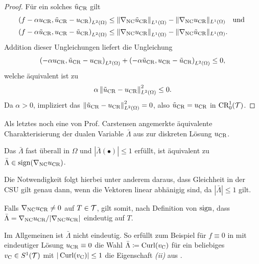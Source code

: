 \begin{proof}
  \medskip
  Für ein solches $\tilde{u}_{\textup{CR}}$ gilt
  \begin{align*}
    \left(f-\alpha u_\textup{CR},\tilde{u}_{\textup{CR}}-u_\textup{CR}\right)_{L^2(\Omega)} 
    &\leq
    \left\Vert\nabla_\textup{NC}\tilde{u}_{\textup{CR}}\right\Vert_{L^1(\Omega)}
    -\Vert\nabla_\textup{NC}u_\textup{CR}\Vert_{L^1(\Omega)}\quad\text{und }\\
    \left(f-\alpha\tilde{u}_{\textup{CR}},u_\textup{CR}-\tilde{u}_{\textup{CR}}\right)_{L^2(\Omega)} 
    &\leq
    \left\Vert\nabla_\textup{NC}u_\textup{CR}\right\Vert_{L^1(\Omega)}
    -\Vert\nabla_\textup{NC}\tilde{u}_{\textup{CR}}\Vert_{L^1(\Omega)}. 
  \end{align*}
  Addition dieser Ungleichungen
  liefert die Ungleichung
  \begin{align*}
    \left(-\alpha u_\textup{CR},\tilde{u}_{\textup{CR}}-u_\textup{CR}\right)_{L^2(\Omega)} 
    + \left(-\alpha\tilde{u}_{\textup{CR}},u_\textup{CR}-\tilde{u}_{\textup{CR}}\right)_{L^2(\Omega)} 
    \leq
    0,
  \end{align*}
  welche äquivalent ist zu
  \begin{align*}
    \alpha\left\Vert\tilde{u}_{\textup{CR}}-u_\textup{CR}\right\Vert_{L^2(\Omega)}^2
    \leq
    0.
  \end{align*}
  Da $\alpha>0$, impliziert das
  $\left\Vert\tilde{u}_{\textup{CR}}-u_\textup{CR}\right\Vert_{L^2(\Omega)}^2=0$, also
  $\tilde{u}_{\textup{CR}}=u_\textup{CR}$ in $\textup{CR}^1_0(\mathcal{T})$.
\end{proof}

Als letztes noch eine von Prof. Carstensen angemerkte äquivalente 
Charakterisierung der dualen Variable $\bar\Lambda$ aus
   zur diskreten Lösung
  $u_\textup{CR}$.
\begin{remark}
  Das $\bar\Lambda$ fast überall in $\Omega$
   und
  $|\bar\Lambda(\bullet)|\leq 1$ erfüllt, ist äquivalent zu 
  $\bar\Lambda\in\operatorname{sign}(\nabla_\textup{NC} u_\textup{CR})$.   

  Die Notwendigkeit folgt hierbei unter anderem daraus, dass Gleichheit in der
  CSU gilt genau dann, wenn die Vektoren linear abhänigig sind, da
  $|\bar\Lambda|\leq 1$ gilt.

  Falls $\nabla_\textup{NC}u_\textup{CR}\neq 0$ auf $T\in\mathcal{T}$, gilt somit, nach Definition von
  $\operatorname{sign}$, dass $\bar\Lambda=\nabla_\textup{NC}u_\textup{CR}/|\nabla_\textup{NC}u_\textup{CR}|$ eindeutig auf
  $T$.

  Im Allgemeinen ist $\bar\Lambda$ nicht eindeutig. So erfüllt zum Beispiel
  für $f\equiv 0$ in  mit eindeutiger Lösung
  $u_\textup{CR}\equiv 0$ die Wahl $\bar\Lambda\coloneqq \operatorname{Curl}(v_{\textup{C}})$ für ein beliebiges
  $v_{\textup{C}}\in S^1(\mathcal{T})$ mit $|\operatorname{Curl}(v_{\textup{C}})|\leq 1$ die Eigenschaft \textit{(ii)}
  aus .
\end{remark}

